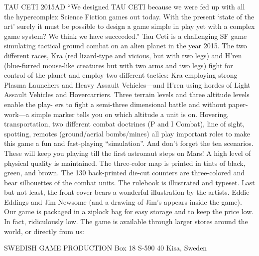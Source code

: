 TAU CETI 2015AD
“We designed TAU CETI because we were fed up 
with all the hypercomplex Science Fiction games 
out today. With the present ‘state of the art’ 
surely it must be possible to design a game 
simple in play yet with a complex game system? 
We think we have succeeded.”
Tau Ceti is a challenging SF game simulating tactical ground 
combat on an alien planet in the year 2015. The two different 
races, Kra (red lizard-type and vicious, but with two legs) and 
H’ren (blue-furred mouse-like creatures but with two arms 
and two legs) fight for control of the planet and employ two 
different tactics: Kra employing strong Plasma Launchers 
and Heavy Assault Vehicles—and H’ren using hordes of Light 
Assault Vehicles and Hovercarriers.
Three terrain levels and three altitude levels enable the play-
ers to fight a semi-three dimensional battle and without paper-
work—a simple marker tells you on which altitude a unit is on. 
Hovering, transportation, two different combat doctrines (P 
and I Combat), line of sight, spotting, remotes (ground/aerial 
bombs/mines) all play important roles to make this game a fun 
and fast-playing “simulation”. And don’t forget the ten 
scenarios. These will keep you playing till the first astronaut 
steps on Mars!
A high level of physical quality is maintained. The three-color 
map is printed in tints of black, green, and brown. The 130 
back-printed die-cut counters are three-colored and bear 
silhouettes of the combat units. The rulebook is illustrated and 
typeset. Last but not least, the front cover bears a wonderful 
illustration by the artists. Eddie Eddings and Jim Newsome 
(and a drawing of Jim’s appears inside the game). Our game 
is packaged in a ziplock bag for easy storage and to keep the 
price low. In fact, ridiculously low.
The game is available through larger stores around the world, 
or directly from us:

SWEDISH GAME PRODUCTION
Box 18
S-590 40 Kisa, Sweden

